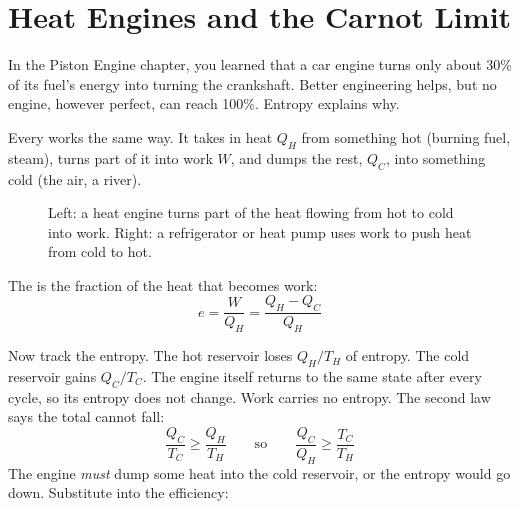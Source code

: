 \section{Heat Engines and the Carnot Limit}
In the Piston Engine chapter, you learned that a car engine turns only about 30\% of its fuel's energy into
turning the crankshaft. Better engineering helps, but no engine, however perfect, can reach 100\%.
Entropy explains why.

Every  works the same way. It takes in heat $Q_H$ from something hot (burning fuel,
steam), turns part of it into work $W$, and dumps the rest, $Q_C$, into something cold (the air, a river).

\begin{figure}[htbp]
\centering
{}
\caption{Left: a heat engine turns part of the heat flowing from hot to cold into work. Right: a refrigerator or heat pump uses work to push heat from cold to hot.}
\label{fig:engine-diagram}
\end{figure}

The  is the fraction of the heat that becomes work:
$$e = \frac{W}{Q_H} = \frac{Q_H - Q_C}{Q_H}$$

Now track the entropy. The hot reservoir loses $Q_H/T_H$ of entropy. The cold reservoir gains $Q_C/T_C$.
The engine itself returns to the same state after every cycle, so its entropy does not change. Work
carries no entropy. The second law says the total cannot fall:
$$\frac{Q_C}{T_C} \geq \frac{Q_H}{T_H} \qquad\text{so}\qquad \frac{Q_C}{Q_H} \geq \frac{T_C}{T_H}$$
The engine \emph{must} dump some heat into the cold reservoir, or the entropy would go down. Substitute
into the efficiency:

